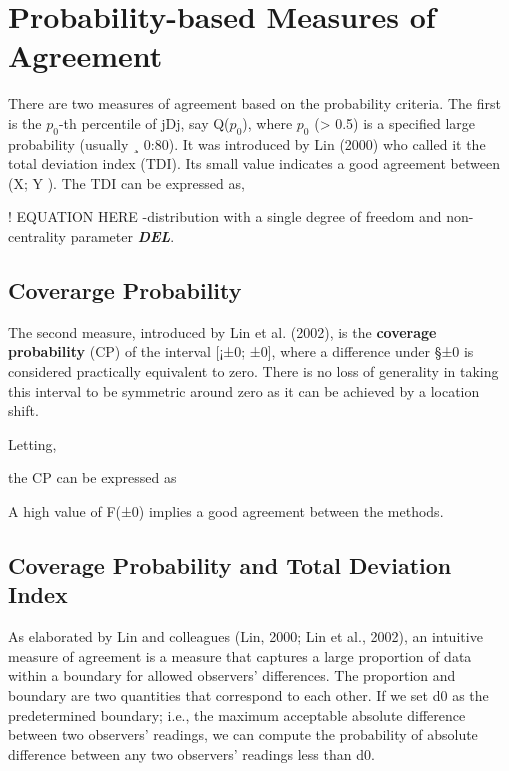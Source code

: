 \documentclass[MAIN.tex]{subfiles}
\begin{document}
\section{Probability-based Measures of Agreement}
There are two measures of agreement based on the probability criteria. The first is the
$p_0$-th percentile of jDj, say Q($p_0$), where $p_0$ (> 0.5) is a specified large probability (usually
¸ 0:80). 
It was introduced by Lin (2000) who called it the total deviation index (TDI). Its
small value indicates a good agreement between (X; Y ). The TDI can be expressed as,

! EQUATION HERE
-distribution with a single degree of freedom and non-centrality parameter \textbf{\textit{DEL}}.

\subsection{Coverarge Probability}

The second measure, introduced by Lin et al. (2002), is the \textbf{coverage probability} (CP) of
the interval [¡±0; ±0], where a difference under §±0 is considered practically equivalent to
zero. There is no loss of generality in taking this interval to be symmetric around zero as it
can be achieved by a location shift. 

Letting,


the CP can be expressed as

A high value of F(±0) implies a good agreement between the methods.

\newpage
\subsection*{Coverage Probability and Total Deviation Index}

As elaborated by Lin and colleagues (Lin, 2000; Lin et al., 2002), an intuitive measure of
agreement is a measure that captures a large proportion of data within a boundary for allowed
observers’ differences. The proportion and boundary are two quantities that correspond to
each other. If we set d0 as the predetermined boundary; i.e., the maximum acceptable
absolute difference between two observers’ readings, we can compute the probability of absolute
difference between any two observers’ readings less than d0. 
\end{document}
